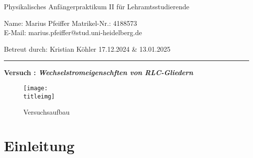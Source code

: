 \documentclass[a4paper,12pt]{article}
\newcounter{versuchnr}
\begin{document}
	
	\newcommand{\name}{Marius Pfeiffer}

	\setcounter{versuchnr}{241}
	\newcommand{\versuchtitel}{Wechselstromeigenschften von RLC-Gliedern}
	\newcommand{\protocolpdf}{files/241messprotokoll.pdf}
	\newcommand{\titleimg}{files/versuchsaufbau.png}
	\newcommand{\betreuer}{Kristian Köhler}
	\newcommand{\datum}{17.12.2024 \& 13.01.2025}
	
	
	\begin{center}
		{Physikalisches Anfängerpraktikum II für Lehramtsstudierende}\\[3mm]
	\end{center}
	
	\vspace*{5mm}
	
	\noindent Name: \name{}
	\hfill Matrikel-Nr.: 4188573\\
	E-Mail: marius.pfeiffer@stud.uni-heidelberg.de
	
	\vspace*{2mm}
	\noindent Betreut durch: \betreuer
    \hfill \datum

	\vspace*{2mm}
	\hrule \vspace*{10mm}

  \begin{center}
    {\bf \large Versuch : \it \bf \versuchtitel}
  \end{center}

  \vspace*{10mm}

  \begin{figure}[H]
    \centering
    \texttt{[image: \\titleimg]}
    \caption{Versuchsaufbau}
  \end{figure}

  \tableofcontents
  \newpage\noindent
	
	\section{Einleitung}
	
	
	
	
  
	
  
	
	\newpage\noindent
	
	
	
	
	\newpage\noindent
	
	
	
\end{document}
